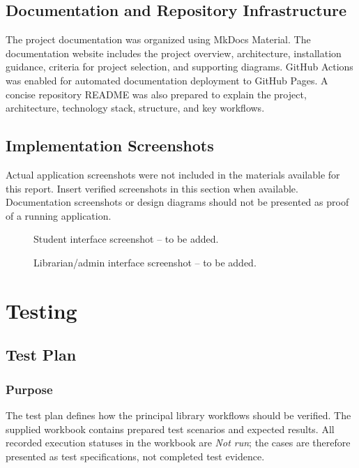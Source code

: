 \documentclass[12pt,a4paper]{report}
\begin{document}
\section{Documentation and Repository Infrastructure}
The project documentation was organized using MkDocs Material. The documentation website includes the project overview, architecture, installation guidance, criteria for project selection, and supporting diagrams. GitHub Actions was enabled for automated documentation deployment to GitHub Pages. A concise repository README was also prepared to explain the project, architecture, technology stack, structure, and key workflows.

\section{Implementation Screenshots}
Actual application screenshots were not included in the materials available for this report. Insert verified screenshots in this section when available. Documentation screenshots or design diagrams should not be presented as proof of a running application.

\begin{figure}[H]\centering
{}
\caption{Student interface screenshot -- to be added.}
\end{figure}
\begin{figure}[H]\centering
{}
\caption{Librarian/admin interface screenshot -- to be added.}
\end{figure}

\chapter{Testing}

\section{Test Plan}

\subsection{Purpose}
The test plan defines how the principal library workflows should be verified. The supplied workbook contains prepared test scenarios and expected results. All recorded execution statuses in the workbook are \textit{Not run}; the cases are therefore presented as test specifications, not completed test evidence.
\end{document}
